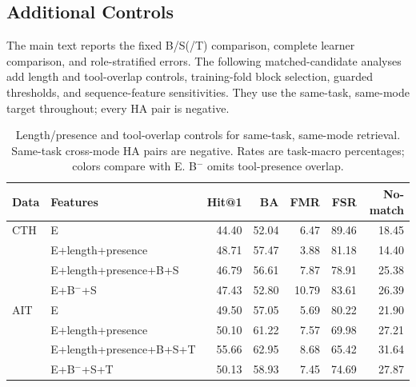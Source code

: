 \documentclass[10pt]{article}
\begin{document}
\subsection{Additional Controls}
The main text reports the fixed B/S(/T) comparison, complete learner comparison, and role-stratified errors. The following matched-candidate analyses add length and tool-overlap controls, training-fold block selection, guarded thresholds, and sequence-feature sensitivities. They use the same-task, same-mode target throughout; every HA pair is negative.
\begin{table}[!htbp]
\centering

\caption{Length/presence and tool-overlap controls for same-task, same-mode retrieval. Same-task cross-mode HA pairs are negative. Rates are task-macro percentages; colors compare with E. B$^{-}$ omits tool-presence overlap.}
\label{tab:same-mode-controls}
\begin{tabular}{@{}llrrrrr@{}}
\toprule
Data & Features & Hit@1 & BA & FMR & FSR & No-match \\
\midrule
CTH & E & 44.40 & 52.04 & 6.47 & 89.46 & 18.45 \\
 & E+length+presence & \cellcolor{AblGoodMid}48.71 & \cellcolor{AblGoodMid}57.47 & \cellcolor{AblGoodLight}3.88 & \cellcolor{AblGoodDeep}81.18 & \cellcolor{AblGoodMid}14.40 \\
 & E+length+presence+B+S & \cellcolor{AblGoodLight}46.79 & \cellcolor{AblGoodMid}56.61 & \cellcolor{AblBadLight}7.87 & \cellcolor{AblGoodDeep}78.91 & \cellcolor{AblBadMid}25.38 \\
 & E+B$^{-}$+S & \cellcolor{AblGoodMid}47.43 & 52.80 & \cellcolor{AblBadMid}10.79 & \cellcolor{AblGoodMid}83.61 & \cellcolor{AblBadMid}26.39 \\
\midrule
AIT & E & 49.50 & 57.05 & 5.69 & 80.22 & 21.90 \\
 & E+length+presence & 50.10 & \cellcolor{AblGoodMid}61.22 & \cellcolor{AblBadLight}7.57 & \cellcolor{AblGoodDeep}69.98 & \cellcolor{AblBadMid}27.21 \\
 & E+length+presence+B+S+T & \cellcolor{AblGoodMid}55.66 & \cellcolor{AblGoodMid}62.95 & \cellcolor{AblBadLight}8.68 & \cellcolor{AblGoodDeep}65.42 & \cellcolor{AblBadDeep}31.64 \\
 & E+B$^{-}$+S+T & 50.13 & \cellcolor{AblGoodLight}58.93 & \cellcolor{AblBadLight}7.45 & \cellcolor{AblGoodMid}74.69 & \cellcolor{AblBadMid}27.87 \\
\bottomrule
\end{tabular}
\end{table}
\end{document}
